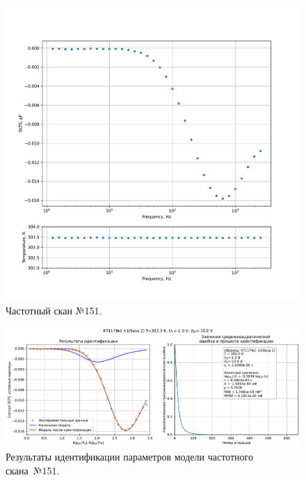 \begin{figure}[!ht]
    \centering
    \includegraphics[width=1\textwidth]{../plots/КТ117№1_п1(база 2)_2500Гц-1Гц_1пФ_+30С_-1В-10В_200мВ_20мкс_шаг_0,1.pdf}
    \caption{Частотный скан №151.}
    \label{pic:frequency_scan_151}
\end{figure}

\begin{figure}[!ht]
    \centering
    \includegraphics[width=1\textwidth]{../plots/КТ117№1_п1(база 2)_2500Гц-1Гц_1пФ_+30С_-1В-10В_200мВ_20мкс_шаг_0,1_model.pdf}
    \caption{Результаты идентификации параметров модели частотного скана~№151.}
    \label{pic:frequency_scan_model151}
\end{figure}

\pagebreak


